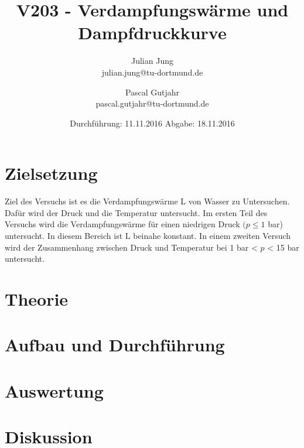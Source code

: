 

\title{V203 - Verdampfungswärme und Dampfdruckkurve}
\author{Julian Jung \\ julian.jung@tu-dortmund.de
  \and Pascal Gutjahr \\ pascal.gutjahr@tu-dortmund.de}
  \date{Durchführung: 11.11.2016
  \hspace{3em}
  Abgabe: 18.11.2016}
  
\maketitle
\newpage
\tableofcontents
\newpage
\section{Zielsetzung}
Ziel des Versuchs ist es die Verdampfungswärme L von Wasser zu Untersuchen.
Dafür wird der Druck und die Temperatur untersucht. Im ersten Teil des Versuchs
wird die Verdampfungswärme für einen niedrigen Druck $(p\le 1$ bar) untersucht. In
diesem Bereich ist L beinahe konstant. In einem zweiten Versuch wird der Zusammenhang
zwischen Druck und Temperatur bei 1 bar < $p$ < 15 bar untersucht.
\section{Theorie}

\section{Aufbau und Durchführung}

\section{Auswertung}

\section{Diskussion}

\printbibliography


